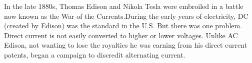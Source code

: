 \documentclass[preview]{standalone}
\begin{document}
\centering \cdot In the late 1880s, Thomas Edison and Nikola Tesla were embroiled in a battle now known as the War of the Currents.\newline \cdot During the early years of electricity, DC (created by Edison) was the standard in the U.S. \cdot But there was one problem. Direct current is not easily converted to higher or lower voltages. Unlike AC \cdot Edison, not wanting to lose the royalties he was earning from his direct current patents, began a campaign to discredit alternating current.
\end{document}
